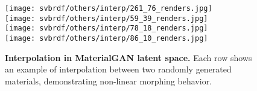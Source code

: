 \begin{figure}[!ht]
	\centering
	\setlength{\resLen}{5.in}
	\addtolength{\tabcolsep}{0pt}
	\texttt{[image: svbrdf/others/interp/261\_76\_renders.jpg]}\\[2pt]
	\texttt{[image: svbrdf/others/interp/59\_39\_renders.jpg]}\\[2pt]
	\texttt{[image: svbrdf/others/interp/78\_18\_renders.jpg]}\\[2pt]
	\texttt{[image: svbrdf/others/interp/86\_10\_renders.jpg]}
	\caption[Interpolation in MaterialGAN latent space]{\label{fig:svbrdf:morph_fake}
		\textbf{Interpolation in MaterialGAN latent space.} Each row shows an example of interpolation between two randomly generated materials, demonstrating non-linear morphing behavior.
	}
\end{figure}
